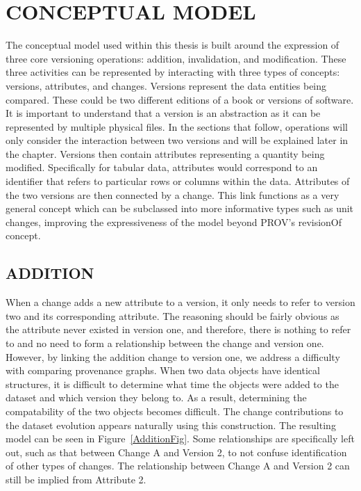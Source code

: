 
\chapter{CONCEPTUAL MODEL}

The conceptual model used within this thesis is built around the expression of three core versioning operations: addition, invalidation, and modification.  These three activities can be represented by interacting with three types of concepts: versions, attributes, and changes.  Versions represent the data entities being compared.  These could be two different editions of a book or versions of software.  It is important to understand that a version is an abstraction as it can be represented by multiple physical files.  In the sections that follow, operations will only consider the interaction between two versions and will be explained later in the chapter.  Versions then contain attributes representing a quantity being modified.  Specifically for tabular data, attributes would correspond to an identifier that refers to particular rows or columns within the data.  Attributes of the two versions are then connected by a change.  This link functions as a very general concept which can be subclassed into more informative types such as unit changes, improving the expressiveness of the model beyond PROV's revisionOf concept.

\section{ADDITION}

When a change adds a new attribute to a version, it only needs to refer to version two and its corresponding attribute.  The reasoning should be fairly obvious as the attribute never existed in version one, and therefore, there is nothing to refer to and no need to form a relationship between the change and version one.  However, by linking the addition change to version one, we address a difficulty with comparing provenance graphs.  When two data objects have identical structures, it is difficult to determine what time the objects were added to the dataset and which version they belong to.  As a result, determining the compatability of the two objects becomes difficult.  The change contributions to the dataset evolution appears naturally using this construction. The resulting model can be seen in Figure~\ref{AdditionFig}.  Some relationships are specifically left out, such as that between Change A and Version 2, to not confuse identification of other types of changes.  The relationship between Change A and Version 2 can still be implied from Attribute 2.

